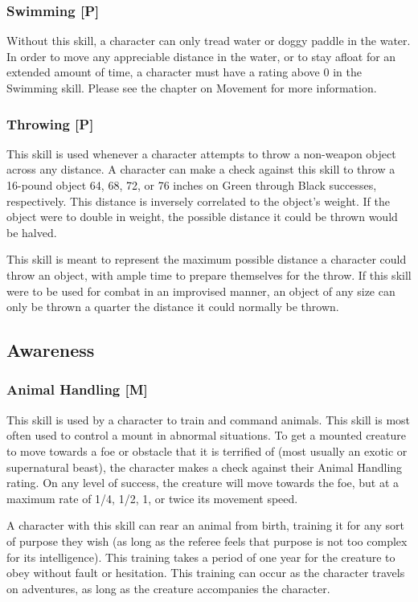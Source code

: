 \documentclass[oneside]{book}
\begin{document}
\begin{multicols}{2}
\subsubsection{Swimming [P]}
Without this skill, a character can only tread water or doggy paddle in the water. In order to move any appreciable distance in the water, or to stay afloat for an extended amount of time, a character must have a rating above 0 in the Swimming skill. Please see the chapter on Movement for more information.

\subsubsection{Throwing [P]}
This skill is used whenever a character attempts to throw a non-weapon object across any distance. A character can make a check against this skill to throw a 16-pound object 64, 68, 72, or 76 inches on Green through Black successes, respectively. This distance is inversely correlated to the object's weight. If the object were to double in weight, the possible distance it could be thrown would be halved. 

This skill is meant to represent the maximum possible distance a character could throw an object, with ample time to prepare themselves for the throw. If this skill were to be used for combat in an improvised manner, an object of any size can only be thrown a quarter the distance it could normally be thrown.

\subsection{Awareness}
\subsubsection{Animal Handling [M]}
This skill is used by a character to train and command animals. This skill is most often used to control a mount in abnormal situations. To get a mounted creature to move towards a foe or obstacle that it is terrified of (most usually an exotic or supernatural beast), the character makes a check against their Animal Handling rating. On any level of success, the creature will move towards the foe, but at a maximum rate of 1/4, 1/2, 1, or twice its movement speed.

A character with this skill can rear an animal from birth, training it for any sort of purpose they wish (as long as the referee feels that purpose is not too complex for its intelligence). This training takes a period of one year for the creature to obey without fault or hesitation. This training can occur as the character travels on adventures, as long as the creature accompanies the character. 


\end{multicols}
\end{document}
